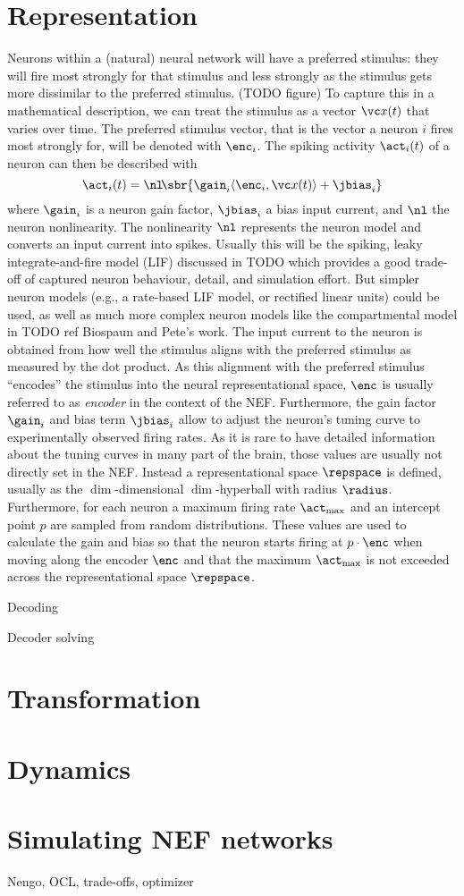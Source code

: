 \section{Representation}
Neurons within a (natural) neural network will have a preferred stimulus: they will fire most strongly for that stimulus and less strongly as the stimulus gets more dissimilar to the preferred stimulus. (TODO figure)
To capture this in a mathematical description, we can treat the stimulus as a vector $\vc x(t)$ that varies over time.
The preferred stimulus vector, that is the vector a neuron $i$ fires most strongly for, will be denoted with $\enc_i$.
The spiking activity $\act_i(t)$ of a neuron can then be described with
\begin{equation}
    \act_i(t) = \nl\!\sbr{\gain_i \langle\enc_i, \vc x(t)\rangle + \jbias_i}
\end{equation}
where $\gain_i$ is a neuron gain factor, $\jbias_i$ a bias input current, and $\nl$ the neuron nonlinearity.
The nonlinearity $\nl$ represents the neuron model and converts an input current into spikes.
Usually this will be the spiking, leaky integrate-and-fire model (LIF) discussed in TODO which provides a good trade-off of captured neuron behaviour, detail, and simulation effort.
But simpler neuron models (e.g., a rate-based LIF model, or rectified linear units) could be used, as well as much more complex neuron models like the compartmental model in TODO ref Biospaun and Pete's work.
The input current to the neuron is obtained from how well the stimulus aligns with the preferred stimulus as measured by the dot product.
As this alignment with the preferred stimulus ``encodes'' the stimulus into the neural representational space, $\enc$ is usually referred to as \emph{encoder} in the context of the NEF\@.
Furthermore, the gain factor $\gain_i$ and bias term $\jbias_i$ allow to adjust the neuron's tuning curve to experimentally observed firing rates.
As it is rare to have detailed information about the tuning curves in many part of the brain, those values are usually not directly set in the NEF\@.
Instead a representational space $\repspace$ is defined, usually as the $\dim$-dimensional $\dim$-hyperball with radius $\radius$.
Furthermore, for each neuron a maximum firing rate $\act_{\max}$ and an intercept point $p$ are sampled from random distributions.
These values are used to calculate the gain and bias so that the neuron starts firing at $p \cdot \enc$ when moving along the encoder $\enc$ and that the maximum $\act_{\max}$ is not exceeded across the representational space $\repspace$.

Decoding

Decoder solving
   
\section{Transformation}

\section{Dynamics}

\section{Simulating NEF networks}
Nengo, OCL, trade-offs, optimizer
